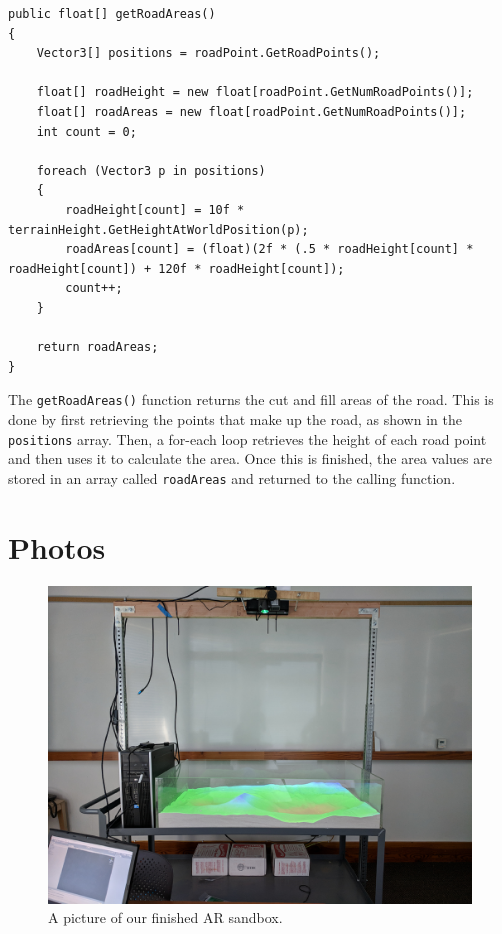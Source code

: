 \documentclass[onecolumn, draftclsnofoot,10pt, compsoc]{IEEEtran}
\begin{document}
\begin{appendices}
\begin{lstlisting}[caption=A code snippet from the cut and fill manager demonstrating how cut and fill calculations work., label=lst:cutfill,captionpos=b]
public float[] getRoadAreas()
{
    Vector3[] positions = roadPoint.GetRoadPoints();

    float[] roadHeight = new float[roadPoint.GetNumRoadPoints()];
    float[] roadAreas = new float[roadPoint.GetNumRoadPoints()];
    int count = 0;

    foreach (Vector3 p in positions)
    {
        roadHeight[count] = 10f * terrainHeight.GetHeightAtWorldPosition(p);
        roadAreas[count] = (float)(2f * (.5 * roadHeight[count] * roadHeight[count]) + 120f * roadHeight[count]);
        count++;
    }

    return roadAreas;
}
\end{lstlisting}

The \texttt{getRoadAreas()} function returns the cut and fill areas of the road. This is done by first retrieving the points that make up the road, as shown in the \texttt{positions} array. Then, a for-each loop retrieves the height of each road point and then uses it to calculate the area. Once this is finished, the area values are stored in an array called \texttt{roadAreas} and returned to the calling function.

\section{Photos}
\begin{figure}[H]
	\centering
	\includegraphics[width=1.\textwidth]{ar_sandbox}
	\caption{A picture of our finished AR sandbox.}
	\label{fig:ar_sandbox}
\end{figure}

\end{appendices}
\end{document}
